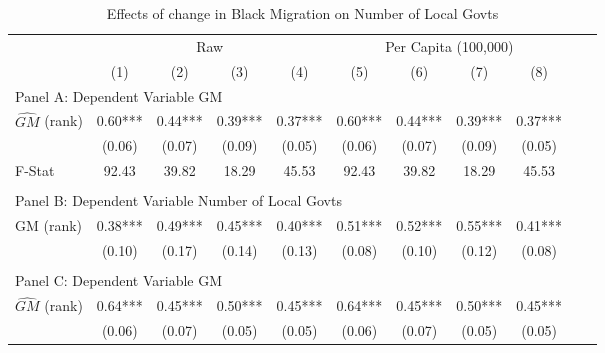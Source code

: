  \begin{table}[htbp]\centering {} \begin{threeparttable} \caption{Effects of change in Black Migration on Number of Local Govts} \begin{tabular}{l*{10}{c}} \toprule
                &\multicolumn{4}{c}{Raw}                                    &\multicolumn{4}{c}{Per Capita (100,000)}                   \\\cmidrule(lr){2-5}\cmidrule(lr){6-9}
                &\multicolumn{1}{c}{(1)}   &\multicolumn{1}{c}{(2)}   &\multicolumn{1}{c}{(3)}   &\multicolumn{1}{c}{(4)}   &\multicolumn{1}{c}{(5)}   &\multicolumn{1}{c}{(6)}   &\multicolumn{1}{c}{(7)}   &\multicolumn{1}{c}{(8)}   \\
\cmidrule(lr){1-9}
\multicolumn{8}{l}{Panel A: Dependent Variable GM}\\
\cmidrule(lr){1-9}
$\hat{GM}$ (rank)&       0.60***&       0.44***&       0.39***&       0.37***&       0.60***&       0.44***&       0.39***&       0.37***\\
                &     (0.06)   &     (0.07)   &     (0.09)   &     (0.05)   &     (0.06)   &     (0.07)   &     (0.09)   &     (0.05)   \\
\midrule
F-Stat          &      92.43   &      39.82   &      18.29   &      45.53   &      92.43   &      39.82   &      18.29   &      45.53   \\
\cmidrule[\heavyrulewidth](lr){1-9} \\ \cmidrule[\heavyrulewidth](lr){1-9}
\multicolumn{8}{l}{Panel B: Dependent Variable Number of Local Govts}\\
\cmidrule(lr){1-9}
GM  (rank)      &       0.38***&       0.49***&       0.45***&       0.40***&       0.51***&       0.52***&       0.55***&       0.41***\\
                &     (0.10)   &     (0.17)   &     (0.14)   &     (0.13)   &     (0.08)   &     (0.10)   &     (0.12)   &     (0.08)   \\
\cmidrule[\heavyrulewidth](lr){1-9} \\ \cmidrule[\heavyrulewidth](lr){1-9}
\multicolumn{8}{l}{Panel C: Dependent Variable GM}\\
\cmidrule(lr){1-9}
$\hat{GM}$ (rank)&       0.64***&       0.45***&       0.50***&       0.45***&       0.64***&       0.45***&       0.50***&       0.45***\\
                &     (0.06)   &     (0.07)   &     (0.05)   &     (0.05)   &     (0.06)   &     (0.07)   &     (0.05)   &     (0.05)   \\

\end{tabular}
\end{threeparttable}
\end{table}
